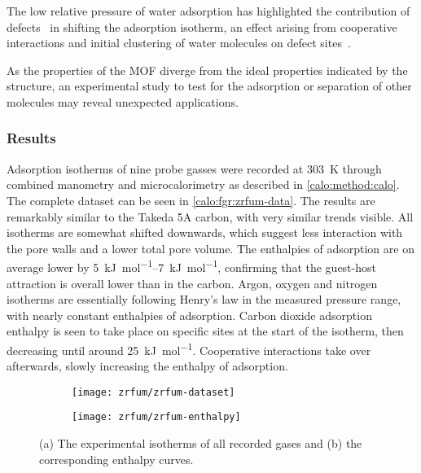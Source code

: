 The low relative pressure of water adsorption has highlighted
the contribution of defects~\cite{choiRoleStructuralDefects2018} in 
shifting the adsorption isotherm, an effect arising from cooperative
interactions and initial clustering of water molecules on defect
sites~\cite{vandichelWaterCoordinationDehydration2016}.

As the properties of the MOF diverge from the ideal properties
indicated by the structure, an experimental study to test for the adsorption
or separation of other molecules may reveal unexpected 
applications.

\subsubsection{Results}

Adsorption isotherms of nine probe gasses were recorded at 
\SI{303}{\kelvin} through combined manometry and microcalorimetry
as described in \autoref{calo:method:calo}. The complete 
dataset can be seen in \autoref{calo:fgr:zrfum-data}.
The results are remarkably similar to the Takeda 5A carbon, with 
very similar trends visible. All isotherms are somewhat 
shifted downwards, which suggest less interaction with the 
pore walls and a lower total pore volume. The enthalpies of 
adsorption are on average lower by \SIrange{5}{7}{\kilo\joule\per\mol},
confirming that the guest-host attraction is overall lower than
in the carbon. Argon, oxygen and nitrogen isotherms are essentially
following Henry's law in the measured pressure range, with nearly constant
enthalpies of adsorption. Carbon dioxide adsorption enthalpy is seen to take
place on specific sites at the start of the isotherm, then
decreasing until around \SI{25}{{\kilo\joule\per\mol}}. Cooperative
interactions take over afterwards, slowly increasing the enthalpy 
of adsorption.

\begin{figure}[htb]
    \centering

	\begin{subfigure}[b]{.45\textwidth}
        \centering
        \texttt{[image: zrfum/zrfum-dataset]}
        \caption{}%
        \label{calo:fgr:zrfum-dataset}
    \end{subfigure}%
	\quad
	\begin{subfigure}[b]{.45\textwidth}
        \centering
        \texttt{[image: zrfum/zrfum-enthalpy]}
        \caption{}%
        \label{calo:fgr:zrfum-enthalpy}
    \end{subfigure}
    \caption{(a) The experimental isotherms of all recorded gases and
    (b) the corresponding enthalpy curves.}%
    \label{calo:fgr:zrfum-data}

\end{figure}

